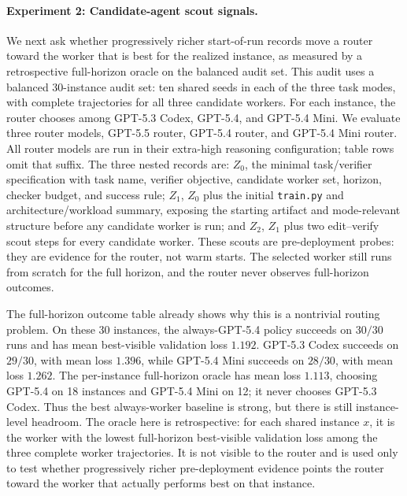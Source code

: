\documentclass{article}
\begin{document}
\paragraph{Experiment 2: Candidate-agent scout signals.}
{\color{green!50!black}
We next ask whether progressively richer start-of-run records move a router toward the worker that is best for the realized instance, as measured by a retrospective full-horizon oracle on the balanced audit set.
This audit uses a balanced 30-instance audit set: ten shared seeds in each of the three task modes, with complete trajectories for all three candidate workers.
For each instance, the router chooses among GPT-5.3 Codex, GPT-5.4, and GPT-5.4 Mini.
We evaluate three router models, GPT-5.5 router, GPT-5.4 router, and GPT-5.4 Mini router.
All router models are run in their extra-high reasoning configuration; table rows omit that suffix.
The three nested records are:
\(Z_0\), the minimal task/verifier specification with task name, verifier objective, candidate worker set, horizon, checker budget, and success rule;
\(Z_1\), \(Z_0\) plus the initial \texttt{train.py} and architecture/workload summary, exposing the starting artifact and mode-relevant structure before any candidate worker is run;
and \(Z_2\), \(Z_1\) plus two edit--verify scout steps for every candidate worker.
These scouts are pre-deployment probes: they are evidence for the router, not warm starts.
The selected worker still runs from scratch for the full horizon, and the router never observes full-horizon outcomes.
}

The full-horizon outcome table already shows why this is a nontrivial routing problem.
On these 30 instances, the always-GPT-5.4 policy succeeds on \(30/30\) runs and has mean best-visible validation loss \(1.192\).
GPT-5.3 Codex succeeds on \(29/30\), with mean loss \(1.396\), while GPT-5.4 Mini succeeds on \(28/30\), with mean loss \(1.262\).
The per-instance full-horizon oracle has mean loss \(1.113\), choosing GPT-5.4 on 18 instances and GPT-5.4 Mini on 12; it never chooses GPT-5.3 Codex.
Thus the best always-worker baseline is strong, but there is still instance-level headroom.
The oracle here is retrospective: for each shared instance \(x\), it is the worker with the lowest full-horizon best-visible validation loss among the three complete worker trajectories.
It is not visible to the router and is used only to test whether progressively richer pre-deployment evidence points the router toward the worker that actually performs best on that instance.
\end{document}
